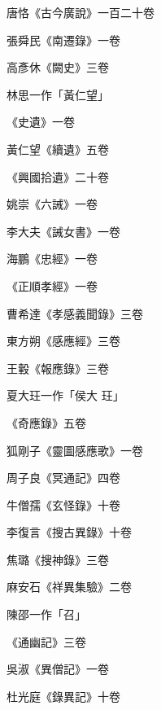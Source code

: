 \begin{pinyinscope}
 唐恪《古今廣說》一百二十卷



 張舜民《南遷錄》一卷



 高彥休《闕史》三卷



 林思一作「黃仁望」



 《史遺》一卷



 黃仁望《續遺》五卷



 《興國拾遺》二十卷



 姚崇《六誡》一卷



 李大夫《誡女書》一卷



 海鵬《忠經》一卷



 《正順孝經》一卷



 曹希達《孝感義聞錄》三卷



 東方朔《感應經》三卷



 王轂《報應錄》三卷



 夏大玨一作「侯大
 玨」



 《奇應錄》五卷



 狐剛子《靈圖感應歌》一卷



 周子良《冥通記》四卷



 牛僧孺《玄怪錄》十卷



 李復言《搜古異錄》十卷



 焦璐《搜神錄》三卷



 麻安石《祥異集驗》二卷



 陳邵一作「召」



 《通幽記》三卷



 吳淑《異僧記》一卷



 杜光庭《錄異記》十卷




\end{pinyinscope}
